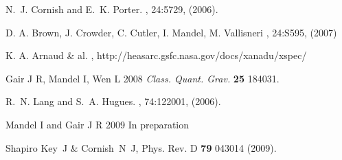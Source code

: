 \documentclass{iopart}
\begin{document}
\begin{thebibliography}{99}
N.~J. Cornish and E.~K. Porter.
, 24:5729, (2006).

D. A. Brown, J. Crowder, C. Cutler, I. Mandel, M. Vallisneri
, 24:{S595}, (2007)  

K. A. Arnaud \& al.
, http://heasarc.gsfc.nasa.gov/docs/xanadu/xspec/ 

Gair J R, Mandel I, Wen L 2008 {\em Class. Quant. Grav.} \textbf{25} 184031.

R.~N. Lang and S.~A. Hugues.
, 74:122001, (2006).

Mandel I and Gair J R 2009 In preparation

 Shapiro Key~J \& Cornish~N~J, Phys. Rev. D {\bf 79} 043014 (2009).

\end{thebibliography}
\end{document}
